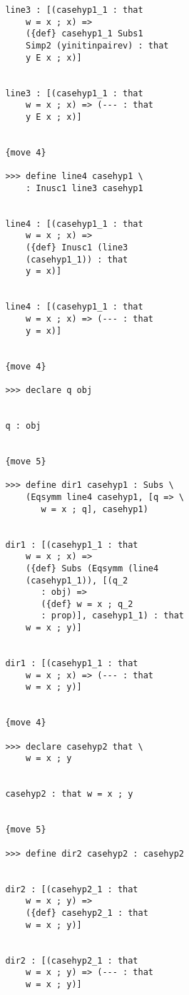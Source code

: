 \documentclass[12pt]{article}
\begin{document}
\begin{verbatim}
               line3 : [(casehyp1_1 : that 
                   w = x ; x) => 
                   ({def} casehyp1_1 Subs1 
                   Simp2 (yinitinpairev) : that 
                   y E x ; x)]


               line3 : [(casehyp1_1 : that 
                   w = x ; x) => (--- : that 
                   y E x ; x)]


               {move 4}

               >>> define line4 casehyp1 \
                   : Inusc1 line3 casehyp1


               line4 : [(casehyp1_1 : that 
                   w = x ; x) => 
                   ({def} Inusc1 (line3 
                   (casehyp1_1)) : that 
                   y = x)]


               line4 : [(casehyp1_1 : that 
                   w = x ; x) => (--- : that 
                   y = x)]


               {move 4}

               >>> declare q obj


               q : obj


               {move 5}

               >>> define dir1 casehyp1 : Subs \
                   (Eqsymm line4 casehyp1, [q => \
                      w = x ; q], casehyp1)


               dir1 : [(casehyp1_1 : that 
                   w = x ; x) => 
                   ({def} Subs (Eqsymm (line4 
                   (casehyp1_1)), [(q_2 
                      : obj) => 
                      ({def} w = x ; q_2 
                      : prop)], casehyp1_1) : that 
                   w = x ; y)]


               dir1 : [(casehyp1_1 : that 
                   w = x ; x) => (--- : that 
                   w = x ; y)]


               {move 4}

               >>> declare casehyp2 that \
                   w = x ; y


               casehyp2 : that w = x ; y


               {move 5}

               >>> define dir2 casehyp2 : casehyp2


               dir2 : [(casehyp2_1 : that 
                   w = x ; y) => 
                   ({def} casehyp2_1 : that 
                   w = x ; y)]


               dir2 : [(casehyp2_1 : that 
                   w = x ; y) => (--- : that 
                   w = x ; y)]



\end{verbatim}
\end{document}

